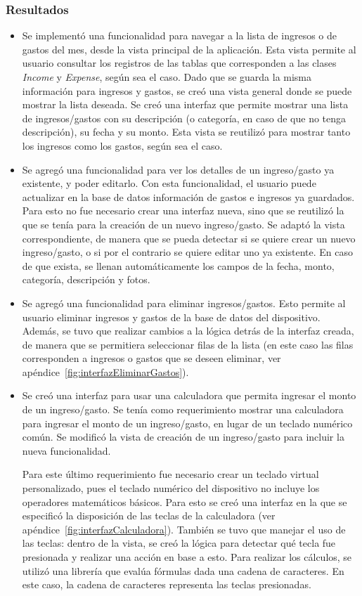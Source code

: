 \subsubsection{Resultados}
\begin{itemize}
\item Se implementó una funcionalidad para navegar a la lista de ingresos o de gastos del mes, desde la vista principal de la aplicación. Esta vista permite al usuario consultar los registros de las tablas que corresponden a las clases \textit{Income} y \textit{Expense}, según sea el caso. Dado que se guarda la misma información para ingresos y gastos, se creó una vista general donde se puede mostrar la lista deseada. Se creó una interfaz que permite mostrar una lista de ingresos/gastos con su descripción (o categoría, en caso de que no tenga descripción), su fecha y su monto. Esta vista se reutilizó para mostrar tanto los ingresos como los gastos, según sea el caso.
\item Se agregó una funcionalidad para ver los detalles de un ingreso/gasto ya existente, y poder editarlo. Con esta funcionalidad, el usuario puede actualizar en la base de datos información de gastos e ingresos ya guardados. Para esto no fue necesario crear una interfaz nueva, sino que se reutilizó la que se tenía para la creación de un nuevo ingreso/gasto. Se adaptó la vista correspondiente, de manera que se pueda detectar si se quiere crear un nuevo ingreso/gasto, o si por el contrario se quiere editar uno ya existente. En caso de que exista, se llenan automáticamente los campos de la fecha, monto, categoría, descripción y fotos.
\item Se agregó una funcionalidad para eliminar ingresos/gastos. Esto permite al usuario eliminar ingresos y gastos de la base de datos del dispositivo. Además, se tuvo que realizar cambios a la lógica detrás de la interfaz creada, de manera que se permitiera seleccionar filas de la lista (en este caso las filas corresponden a ingresos o gastos que se deseen eliminar, ver apéndice~\ref{fig:interfazEliminarGastos}). 
\item Se creó una interfaz para usar una calculadora que permita ingresar el monto de un ingreso/gasto. 
Se tenía como requerimiento mostrar una calculadora para ingresar el monto de un ingreso/gasto, en lugar de un teclado numérico común. Se modificó la vista de creación de un ingreso/gasto para incluir la nueva funcionalidad. 

Para este último requerimiento fue necesario crear un teclado virtual personalizado, pues el teclado numérico del dispositivo no incluye los operadores matemáticos básicos. Para esto se creó una interfaz en la que se especificó la disposición de las teclas de la calculadora (ver apéndice~\ref{fig:interfazCalculadora}). También se tuvo que manejar el uso de las teclas: dentro de la vista, se creó la lógica para detectar qué tecla fue presionada y realizar una acción en base a esto. Para realizar los cálculos, se utilizó una librería que evalúa fórmulas dada una cadena de caracteres. En este caso, la cadena de caracteres representa las teclas presionadas.


\end{itemize}
